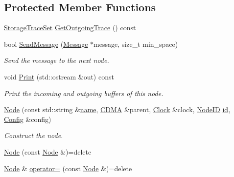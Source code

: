 \subsection*{Protected Member Functions}
\begin{DoxyCompactItemize}
\item 
\hyperlink{class_simulator_1_1_storage_trace_set}{Storage\+Trace\+Set} \hyperlink{class_simulator_1_1_c_d_m_a_1_1_node_ac56236dcb26a491231e67686684f823c}{Get\+Outgoing\+Trace} () const 
\item 
bool \hyperlink{class_simulator_1_1_c_d_m_a_1_1_node_a08211f1925fd7b0ae14e59630ec5d4ba}{Send\+Message} (\hyperlink{union_simulator_1_1_c_d_m_a_1_1_node_1_1_message}{Message} $\ast$message, size\+\_\+t min\+\_\+space)
\begin{DoxyCompactList}\small\item\em Send the message to the next node. \end{DoxyCompactList}\item 
void \hyperlink{class_simulator_1_1_c_d_m_a_1_1_node_a92a18d8f25fcfdb144b4225d033cc4e9}{Print} (std\+::ostream \&out) const 
\begin{DoxyCompactList}\small\item\em Print the incoming and outgoing buffers of this node. \end{DoxyCompactList}\item 
\hyperlink{class_simulator_1_1_c_d_m_a_1_1_node_a3d7bcb2119c3af619b52283f9ab8749b}{Node} (const std\+::string \&\hyperlink{mtconf_8c_a8f8f80d37794cde9472343e4487ba3eb}{name}, \hyperlink{class_simulator_1_1_c_d_m_a}{C\+D\+M\+A} \&parent, \hyperlink{class_simulator_1_1_clock}{Clock} \&clock, \hyperlink{class_simulator_1_1_c_d_m_a_a59272166fd32e642f3113c22cc756927}{Node\+I\+D} \hyperlink{mtconf_8c_aa3185401f04d30bd505daebf48c39cc5}{id}, \hyperlink{class_config}{Config} \&config)
\begin{DoxyCompactList}\small\item\em Construct the node. \end{DoxyCompactList}\item 
\hyperlink{class_simulator_1_1_c_d_m_a_1_1_node_a1f791a59f5ba751c4173123ce111d3ee}{Node} (const \hyperlink{class_simulator_1_1_c_d_m_a_1_1_node}{Node} \&)=delete
\item 
\hyperlink{class_simulator_1_1_c_d_m_a_1_1_node}{Node} \& \hyperlink{class_simulator_1_1_c_d_m_a_1_1_node_a24b08c1cffc694dcabeb72059b480308}{operator=} (const \hyperlink{class_simulator_1_1_c_d_m_a_1_1_node}{Node} \&)=delete
\item 

\end{DoxyCompactItemize}
